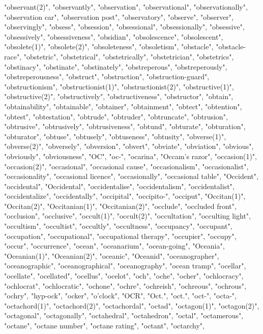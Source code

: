 "observant(2)",
"observantly",
"observation",
"observational",
"observationally",
"observation car",
"observation post",
"observatory",
"observe",
"observer",
"observingly",
"obsess",
"obsession",
"obsessional",
"obsessionally",
"obsessive",
"obsessively",
"obsessiveness",
"obsidian",
"obsolescence",
"obsolescent",
"obsolete(1)",
"obsolete(2)",
"obsoleteness",
"obsoletism",
"obstacle",
"obstacle-race",
"obstetric",
"obstetrical",
"obstetrically",
"obstetrician",
"obstetrics",
"obstinacy",
"obstinate",
"obstinately",
"obstreperous",
"obstreperously",
"obstreperousness",
"obstruct",
"obstruction",
"obstruction-guard",
"obstructionism",
"obstructionist(1)",
"obstructionist(2)",
"obstructive(1)",
"obstructive(2)",
"obstructively",
"obstructiveness",
"obstructor",
"obtain",
"obtainability",
"obtainable",
"obtainer",
"obtainment",
"obtect",
"obtention",
"obtest",
"obtestation",
"obtrude",
"obtruder",
"obtruncate",
"obtrusion",
"obtrusive",
"obtrusively",
"obtrusiveness",
"obtund",
"obturate",
"obturation",
"obturator",
"obtuse",
"obtusely",
"obtuseness",
"obtusity",
"obverse(1)",
"obverse(2)",
"obversely",
"obversion",
"obvert",
"obviate",
"obviation",
"obvious",
"obviously",
"obviousness",
"OC",
"oc-",
"ocarina",
"Occam's razor",
"occasion(1)",
"occasion(2)",
"occasional",
"occasional cause",
"occasionalism",
"occasionalist",
"occasionality",
"occasional licence",
"occasionally",
"occasional table",
"Occident",
"occidental",
"Occidental",
"occidentalise",
"occidentalism",
"occidentalist",
"occidentalize",
"occidentally",
"occipital",
"occipito-",
"occiput",
"Occitan(1)",
"Occitan(2)",
"Occitanian(1)",
"Occitanian(2)",
"occlude",
"occluded front",
"occlusion",
"occlusive",
"occult(1)",
"occult(2)",
"occultation",
"occulting light",
"occultism",
"occultist",
"occultly",
"occultness",
"occupancy",
"occupant",
"occupation",
"occupational",
"occupational therapy",
"occupier",
"occupy",
"occur",
"occurrence",
"ocean",
"oceanarium",
"ocean-going",
"Oceania",
"Oceanian(1)",
"Oceanian(2)",
"oceanic",
"Oceanid",
"oceanographer",
"oceanographic",
"oceanographical",
"oceanography",
"ocean tramp",
"ocellar",
"ocellate",
"ocellated",
"ocellus",
"ocelot",
"och",
"oche",
"ocher",
"ochlocracy",
"ochlocrat",
"ochlocratic",
"ochone",
"ochre",
"ochreish",
"ochreous",
"ochrous",
"ochry",
"hyp-ock",
"ocker",
"o'clock",
"OCR",
"Oct.",
"oct.",
"oct-",
"octa-",
"octachord(1)",
"octachord(2)",
"octachordal",
"octad",
"octagon(1)",
"octagon(2)",
"octagonal",
"octagonally",
"octahedral",
"octahedron",
"octal",
"octamerous",
"octane",
"octane number",
"octane rating",
"octant",
"octarchy",
